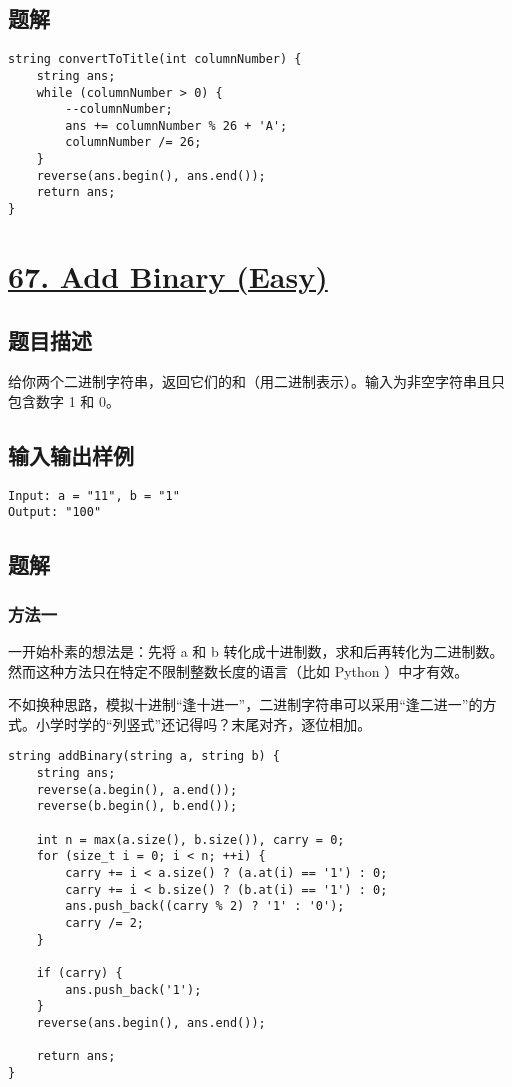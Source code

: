 \documentclass[lang=cn,10pt]{elegantbook}
\begin{document}
\subsection*{题解}

\begin{lstlisting}
string convertToTitle(int columnNumber) {
	string ans;
	while (columnNumber > 0) {
		--columnNumber;
		ans += columnNumber % 26 + 'A';
		columnNumber /= 26;
	}
	reverse(ans.begin(), ans.end());
	return ans;
}
\end{lstlisting}

{\color{red}\section{\href{https://leetcode.cn/problems/add-binary/}{67. Add Binary (Easy)}}} \label{ch9.67}

\subsection*{题目描述}

给你两个二进制字符串，返回它们的和（用二进制表示）。输入为非空字符串且只包含数字 1 和 0。

\subsection*{输入输出样例}

\begin{lstlisting}
Input: a = "11", b = "1"
Output: "100"
\end{lstlisting}

\subsection*{题解}

\subsubsection*{方法一}

一开始朴素的想法是：先将 a 和 b 转化成十进制数，求和后再转化为二进制数。然而这种方法只在特定不限制整数长度的语言（比如 Python ）中才有效。

不如换种思路，模拟十进制“逢十进一”，二进制字符串可以采用“逢二进一”的方式。小学时学的“列竖式”还记得吗？末尾对齐，逐位相加。

\begin{lstlisting}
string addBinary(string a, string b) {
	string ans;
	reverse(a.begin(), a.end());
	reverse(b.begin(), b.end());
	
	int n = max(a.size(), b.size()), carry = 0;
	for (size_t i = 0; i < n; ++i) {
		carry += i < a.size() ? (a.at(i) == '1') : 0;
		carry += i < b.size() ? (b.at(i) == '1') : 0;
		ans.push_back((carry % 2) ? '1' : '0');
		carry /= 2;
	}
	
	if (carry) {
		ans.push_back('1');
	}
	reverse(ans.begin(), ans.end());
	
	return ans;
}
\end{lstlisting}
\end{document}
